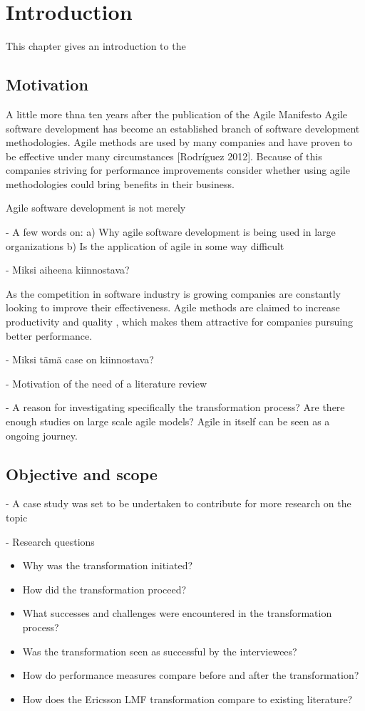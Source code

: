 
\chapter{Introduction}
\label{chapter:intro}

This chapter gives an introduction to the

\section{Motivation}

A little more thna ten years after the publication of the Agile Manifesto Agile
software development has become an established branch of software development
methodologies. Agile methods are used by many companies and have proven to be
effective under many circumstances [Rodríguez 2012]. Because of this companies
striving for performance improvements consider whether using agile methodologies
could bring benefits in their business.

Agile software development is not merely 

- A few words on:
a) Why agile software development is being used in large organizations
b) Is the application of agile in some way difficult

- Miksi aiheena kiinnostava?

As the competition in software industry is growing companies are constantly
looking to improve their effectiveness. Agile methods are claimed to increase
productivity and quality \cite{Livermore2008}, which makes them attractive
for companies pursuing better performance.

- Miksi tämä case on kiinnostava?

- Motivation of the need of a literature review

- A reason for investigating specifically the transformation process? Are there
enough studies on large scale agile models? Agile in itself can be seen as a
ongoing journey.

\section{Objective and scope}

- A case study was set to be undertaken to contribute for more research on the topic

- Research questions

\begin{itemize}
  \item Why was the transformation initiated?
  \item How did the transformation proceed?
  \item What successes and challenges were encountered in the transformation
        process?
  \item Was the transformation seen as successful by the interviewees?
  \item How do performance measures compare before and after the transformation?
  \item How does the Ericsson LMF transformation compare to existing literature?
\end{itemize}

